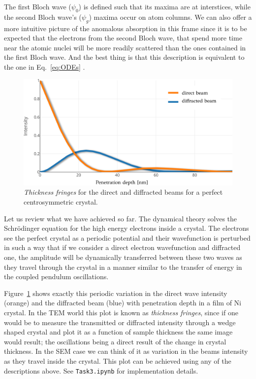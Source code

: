  The first Bloch wave ($\psi_0$) is defined such that its maxima are at interstices, while the second Bloch wave's ($\psi_g$) maxima occur on atom columns. We can also offer a more intuitive picture of the anomalous absorption in this frame since it is to be expected that the electrons from the second Bloch wave, that spend more time near the atomic nuclei will be more readily scattered than the ones contained in the first Bloch wave. And the best thing is that this description is equivalent to the one in Eq.~\ref{eq:ODEs} \cite{electronMicroscopy}.



\begin{figure}[ht]
    \centering
\includegraphics[width=0.84\linewidth]{Figures/fringes.png}
\caption[Thickness fringes.]{\textit{Thickness fringes} for the direct and diffracted beams for a perfect centrosymmetric crystal.}
\label{Fig:fringes}

\end{figure}


Let us review what we have achieved so far. The dynamical theory solves the Schr\"{o}dinger equation for the high energy electrons inside a crystal. The electrons see the perfect crystal as a periodic potential and their wavefunction is perturbed in such a way that if we consider a direct electron wavefunction and  diffracted one, the amplitude will be dynamically transferred between these two waves as they travel through the crystal in a manner similar to the transfer of energy in the coupled pendulum oscillations.




Figure~\ref{Fig:fringes} shows exactly this periodic variation in the direct wave intensity (orange) and the diffracted beam (blue) with penetration depth in a film of Ni crystal. In the TEM world this plot is known as \textit{thickness fringes}, since if one would be to measure the transmitted or diffracted intensity through a wedge shaped crystal and plot it as a function of sample thickness the same image would result; the oscillations being a direct result of the change in crystal thickness. In the SEM case we can think of it as variation in the beams intensity as they travel inside the crystal. This plot can be achieved using any of the descriptions above. See \texttt{Task3.ipynb} for implementation  details.


